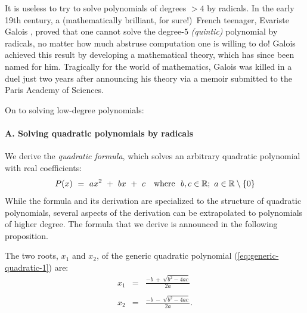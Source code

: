 It is useless to try to solve polynomials of degrees $> 4$ by
radicals.  In the early 19th century, a (mathematically brilliant, for
sure!)~French teenager, Evariste Galois ,
proved that one cannot solve the degree-$5$ {\it (quintic)}
 polynomial by radicals, no matter how much
abstruse computation one is willing to do!  Galois achieved this
result by developing a mathematical theory, which has since been named
for him.  Tragically for the world of
mathematics, Galois was killed in a duel just two years after
announcing his theory via a memoir submitted to the Paris Academy of
Sciences.

\bigskip

\noindent
On to solving low-degree polynomials:

\medskip

\paragraph{\small\sf A. Solving quadratic polynomials by radicals}

\noindent
We derive the {\it quadratic formula}, which solves an arbitrary
quadratic polynomial  with real
coefficients:  
\begin{equation}
\label{eq:generic-quadratic-1}
P(x) \ = \  ax^2 \ + \ bx \ + \ c \ \ \mbox{  where  } \ b,c \in \mathbb{R};
\ a \in \mathbb{R} \setminus \{0\}
\end{equation}
While the formula and its derivation are specialized to the structure
of quadratic polynomials, several aspects of the derivation can be
extrapolated to polynomials of higher degree.  The formula that we
derive is announced in the following proposition.  

\begin{prop}
\label{thm:quadratic-formula}
The two roots, $x_1$ and $x_2$, of the generic quadratic polynomial
(\ref{eq:generic-quadratic-1}) are:
\begin{eqnarray}
\nonumber
x_1 & = & \frac{-b \ + \ \sqrt{b^2 -4ac}}{2a} \\
\label{eq:generic-quadratic-4}
    &   & \\
\nonumber
x_2 & = & \frac{-b \ - \ \sqrt{b^2 -4ac}}{2a}.
\end{eqnarray}
\end{prop}


